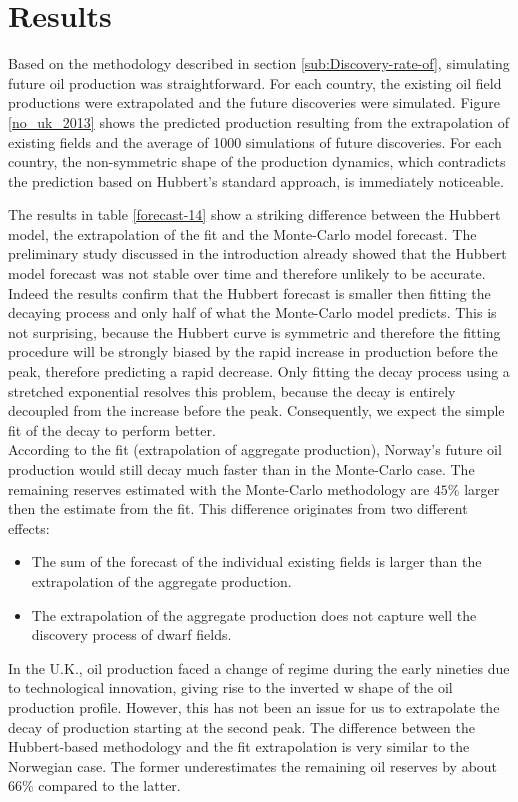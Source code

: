 \documentclass[review]{elsarticle}
\begin{document}
\section{Results\label{sec:Results}}

Based on the methodology described in section \ref{sub:Discovery-rate-of},
simulating future oil production was straightforward. For each country,
the existing oil field productions were extrapolated and the future discoveries were simulated. Figure \ref{no_uk_2013} shows the predicted production resulting from the extrapolation of existing fields and the average of 1000 simulations of future discoveries.
For each country, the non-symmetric shape of the production dynamics, which
contradicts the prediction based on Hubbert's standard approach, is immediately noticeable.

The results in table \ref{forecast-14} show a striking difference
between the Hubbert model, the extrapolation of the fit and the Monte-Carlo model forecast. The preliminary study discussed in the introduction already showed that the Hubbert model forecast was not stable over time and therefore unlikely to be accurate. Indeed the results confirm that the Hubbert forecast is smaller then fitting the decaying process and only half of what the Monte-Carlo model predicts. This is not surprising, because the Hubbert curve is symmetric and therefore the fitting procedure will be strongly biased by the rapid increase in production before the peak, therefore predicting a rapid decrease. Only fitting the decay process using a stretched exponential resolves this problem, because the decay is entirely decoupled from the increase before the peak. Consequently, we expect the simple fit of the decay to perform better.\\
According to the fit (extrapolation of aggregate production), Norway's future oil production would still decay much faster than in the Monte-Carlo case. The remaining reserves estimated with the Monte-Carlo methodology are $45\%$ larger
then the estimate from the fit. This difference originates from two
different effects:
\begin{itemize}
\item The sum of the forecast of the individual existing fields is larger
than the extrapolation of the aggregate production.
\item The extrapolation of the aggregate production does not capture well
the discovery process of dwarf fields.
\end{itemize}
In the U.K., oil production faced a change of regime during the early
nineties due to technological innovation, giving rise to the inverted
\textquotedbl{}w shape\textquotedbl{} of the oil production profile.
However, this has not been an issue for us to extrapolate the decay of production
starting at the second peak. The difference between the Hubbert-based
methodology and the fit extrapolation is very similar to the Norwegian
case. The former underestimates the remaining oil reserves by about
$66\%$ compared to the latter.
\end{document}
